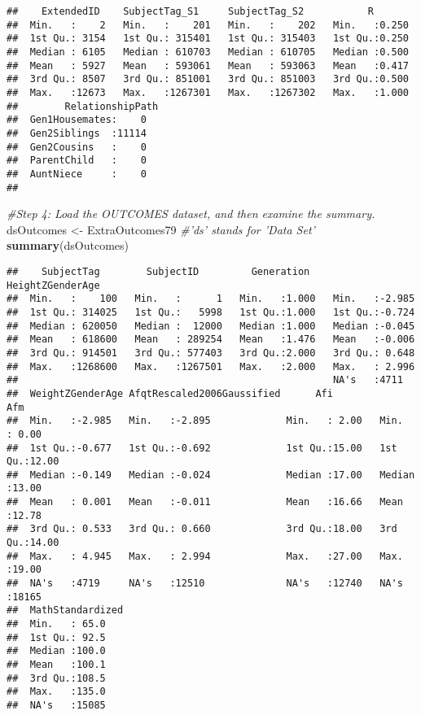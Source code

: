 \documentclass[smallextended]{svjour3}       %
\newenvironment{Shaded}{\begin{snugshade}}{\end{snugshade}}
\newcommand{\CommentTok}[1]{\textcolor[rgb]{0.56,0.35,0.01}{\textit{#1}}}
\newcommand{\KeywordTok}[1]{\textcolor[rgb]{0.13,0.29,0.53}{\textbf{#1}}}
\newcommand{\NormalTok}[1]{#1}
\newcommand{\StringTok}[1]{\textcolor[rgb]{0.31,0.60,0.02}{#1}}
\begin{document}
\begin{verbatim}
##    ExtendedID    SubjectTag_S1     SubjectTag_S2           R        
##  Min.   :    2   Min.   :    201   Min.   :    202   Min.   :0.250  
##  1st Qu.: 3154   1st Qu.: 315401   1st Qu.: 315403   1st Qu.:0.250  
##  Median : 6105   Median : 610703   Median : 610705   Median :0.500  
##  Mean   : 5927   Mean   : 593061   Mean   : 593063   Mean   :0.417  
##  3rd Qu.: 8507   3rd Qu.: 851001   3rd Qu.: 851003   3rd Qu.:0.500  
##  Max.   :12673   Max.   :1267301   Max.   :1267302   Max.   :1.000  
##        RelationshipPath
##  Gen1Housemates:    0  
##  Gen2Siblings  :11114  
##  Gen2Cousins   :    0  
##  ParentChild   :    0  
##  AuntNiece     :    0  
## 
\end{verbatim}

\begin{Shaded}
\begin{Highlighting}[]
\CommentTok{#Step 4: Load the OUTCOMES dataset, and then examine the summary.}
\NormalTok{dsOutcomes <-}\StringTok{ }\NormalTok{ExtraOutcomes79 }\CommentTok{#'ds' stands for 'Data Set'}
\KeywordTok{summary}\NormalTok{(dsOutcomes)}
\end{Highlighting}
\end{Shaded}

\begin{verbatim}
##    SubjectTag        SubjectID         Generation    HeightZGenderAge
##  Min.   :    100   Min.   :      1   Min.   :1.000   Min.   :-2.985  
##  1st Qu.: 314025   1st Qu.:   5998   1st Qu.:1.000   1st Qu.:-0.724  
##  Median : 620050   Median :  12000   Median :1.000   Median :-0.045  
##  Mean   : 618600   Mean   : 289254   Mean   :1.476   Mean   :-0.006  
##  3rd Qu.: 914501   3rd Qu.: 577403   3rd Qu.:2.000   3rd Qu.: 0.648  
##  Max.   :1268600   Max.   :1267501   Max.   :2.000   Max.   : 2.996  
##                                                      NA's   :4711    
##  WeightZGenderAge AfqtRescaled2006Gaussified      Afi             Afm       
##  Min.   :-2.985   Min.   :-2.895             Min.   : 2.00   Min.   : 0.00  
##  1st Qu.:-0.677   1st Qu.:-0.692             1st Qu.:15.00   1st Qu.:12.00  
##  Median :-0.149   Median :-0.024             Median :17.00   Median :13.00  
##  Mean   : 0.001   Mean   :-0.011             Mean   :16.66   Mean   :12.78  
##  3rd Qu.: 0.533   3rd Qu.: 0.660             3rd Qu.:18.00   3rd Qu.:14.00  
##  Max.   : 4.945   Max.   : 2.994             Max.   :27.00   Max.   :19.00  
##  NA's   :4719     NA's   :12510              NA's   :12740   NA's   :18165  
##  MathStandardized
##  Min.   : 65.0   
##  1st Qu.: 92.5   
##  Median :100.0   
##  Mean   :100.1   
##  3rd Qu.:108.5   
##  Max.   :135.0   
##  NA's   :15085
\end{verbatim}
\end{document}
